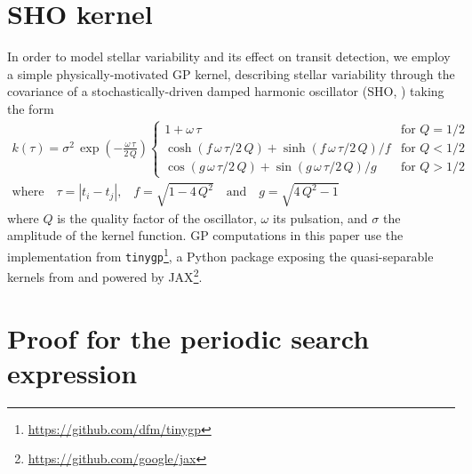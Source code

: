 \documentclass[modern]{aastex631}
\begin{document}
\newpage
\appendix
\section{SHO kernel}\label{app_gp}
In order to model stellar variability and its effect on transit detection, we employ a simple physically-motivated GP kernel, describing stellar variability through the covariance of a stochastically-driven damped harmonic oscillator (SHO, \citealt{celerite, celerite2}) taking the form 
\begin{equation}
    \begin{gathered}
        k(\tau) = \sigma^2\,\exp\left(-\frac{\omega\,\tau}{2\,Q}\right)
        \left\{\begin{array}{ll}
            1 + \omega\,\tau & \mbox{for } Q = 1/2 \\
            \cosh(f\,\omega\,\tau/2\,Q) + \sinh(f\,\omega\,\tau/2\,Q)/f
                & \mbox{for } Q < 1/2 \\
            \cos(g\,\omega\,\tau/2\,Q) + \sin(g\,\omega\,\tau/2\,Q)/g
                & \mbox{for } Q > 1/2
        \end{array}\right. \\
        \text{where}\quad \tau = |t_i - t_j|\text{,}\quad f = \sqrt{1 - 4\,Q^2} \quad \text{and}\quad g = \sqrt{4\,Q^2 - 1}
    \end{gathered}
\end{equation}
where $Q$ is the quality factor of the oscillator, $\omega$ its pulsation, and $\sigma$ the amplitude of the kernel function. GP computations in this paper use the implementation from \texttt{tinygp}\footnote{\href{https://github.com/dfm/tinygp}{https://github.com/dfm/tinygp}}, a Python package exposing the quasi-separable kernels from \cite{celerite2} and powered by \textsf{JAX}\footnote{\href{https://github.com/google/jax}{https://github.com/google/jax}}.

\section{Proof for the periodic search expression}\label{proof}
\end{document}
